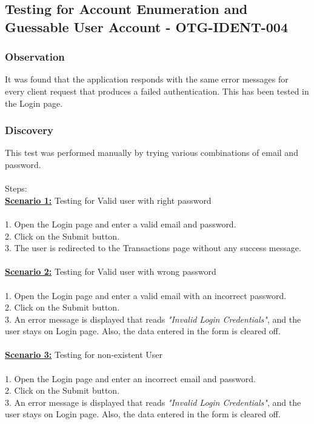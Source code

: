 \subsection{Testing for Account Enumeration and Guessable User Account - OTG-IDENT-004} \label{OTG-IDENT-004}

\subsubsection{Observation}
It was found that the application responds with the same error messages for every client request that produces a failed authentication. This has been tested in the Login page.

\subsubsection{Discovery}
This test was performed manually by trying various combinations of email and password. \\
\\Steps: \\
\underline{\textbf{Scenario 1:}} Testing for Valid user with right password \\
\\1. Open the Login page and enter a valid email and password. \\
2. Click on the Submit button. \\
3. The user is redirected to the Transactions page without any success message. \\
\\\underline{\textbf{Scenario 2:}} Testing for Valid user with wrong password \\
\\1. Open the Login page and enter a valid email with an incorrect password. \\
2. Click on the Submit button. \\
3. An error message is displayed that reads \textit{"Invalid Login Credentials"}, and the user stays on Login page. Also, the data entered in the form is cleared off.\\
\\\underline{\textbf{Scenario 3:}} Testing for non-existent User\\
\\1. Open the Login page and enter an incorrect email and password. \\
2. Click on the Submit button. \\
3. An error message is displayed that reads \textit{"Invalid Login Credentials"}, and the user stays on Login page. Also, the data entered in the form is cleared off.\\

